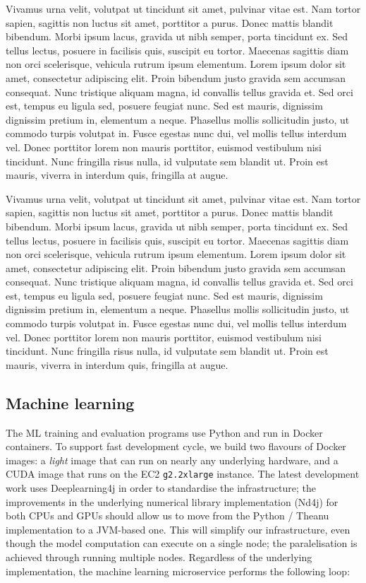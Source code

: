\documentclass[a4paper, 10 pt, conference]{IEEEtran}
\begin{document}
Vivamus urna velit, volutpat ut tincidunt sit amet, pulvinar vitae est. Nam tortor sapien, sagittis non luctus sit amet, porttitor a purus. Donec mattis blandit bibendum. Morbi ipsum lacus, gravida ut nibh semper, porta tincidunt ex. Sed tellus lectus, posuere in facilisis quis, suscipit eu tortor. Maecenas sagittis diam non orci scelerisque, vehicula rutrum ipsum elementum. Lorem ipsum dolor sit amet, consectetur adipiscing elit. Proin bibendum justo gravida sem accumsan consequat. Nunc tristique aliquam magna, id convallis tellus gravida et. Sed orci est, tempus eu ligula sed, posuere feugiat nunc. Sed est mauris, dignissim dignissim pretium in, elementum a neque. Phasellus mollis sollicitudin justo, ut commodo turpis volutpat in. Fusce egestas nunc dui, vel mollis tellus interdum vel. Donec porttitor lorem non mauris porttitor, euismod vestibulum nisi tincidunt. Nunc fringilla risus nulla, id vulputate sem blandit ut. Proin est mauris, viverra in interdum quis, fringilla at augue.

Vivamus urna velit, volutpat ut tincidunt sit amet, pulvinar vitae est. Nam tortor sapien, sagittis non luctus sit amet, porttitor a purus. Donec mattis blandit bibendum. Morbi ipsum lacus, gravida ut nibh semper, porta tincidunt ex. Sed tellus lectus, posuere in facilisis quis, suscipit eu tortor. Maecenas sagittis diam non orci scelerisque, vehicula rutrum ipsum elementum. Lorem ipsum dolor sit amet, consectetur adipiscing elit. Proin bibendum justo gravida sem accumsan consequat. Nunc tristique aliquam magna, id convallis tellus gravida et. Sed orci est, tempus eu ligula sed, posuere feugiat nunc. Sed est mauris, dignissim dignissim pretium in, elementum a neque. Phasellus mollis sollicitudin justo, ut commodo turpis volutpat in. Fusce egestas nunc dui, vel mollis tellus interdum vel. Donec porttitor lorem non mauris porttitor, euismod vestibulum nisi tincidunt. Nunc fringilla risus nulla, id vulputate sem blandit ut. Proin est mauris, viverra in interdum quis, fringilla at augue.

\subsection{Machine learning}

The ML training and evaluation programs use Python and run in Docker containers. To support fast development cycle, we build two flavours of Docker images: a \emph{light} image that can run on nearly any underlying hardware, and a CUDA \cite{cuda} image that runs on the EC2 \texttt{g2.2xlarge} instance. The latest development work uses Deeplearning4j \cite{dl4j} in order to standardise the infrastructure; the improvements in the underlying numerical library implementation (Nd4j) for both CPUs and GPUs should allow us to move from the Python / Theanu implementation to a JVM-based one. This will simplify our infrastructure, even though the model computation can execute on a single node; the paralelisation is achieved through running multiple nodes. Regardless of the underlying implementation, the machine learning microservice performs the following loop:
\end{document}
